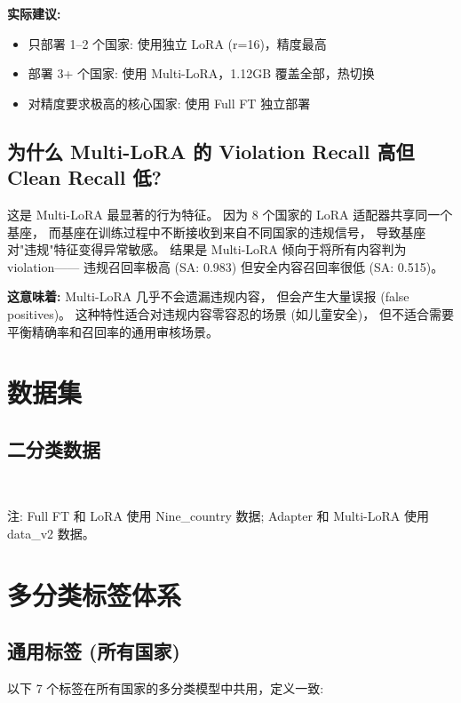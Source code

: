 \documentclass[11pt,a4paper]{article}
\begin{document}
\textbf{实际建议:}
\begin{itemize}
\item 只部署 1--2 个国家: 使用独立 LoRA (r=16)，精度最高
\item 部署 3+ 个国家: 使用 Multi-LoRA，1.12GB 覆盖全部，热切换
\item 对精度要求极高的核心国家: 使用 Full FT 独立部署
\end{itemize}

\subsection{为什么 Multi-LoRA 的 Violation Recall 高但 Clean Recall 低?}

这是 Multi-LoRA 最显著的行为特征。
因为 8 个国家的 LoRA 适配器共享同一个基座，
而基座在训练过程中不断接收到来自不同国家的违规信号，
导致基座对"违规"特征变得异常敏感。
结果是 Multi-LoRA 倾向于将所有内容判为 violation——
违规召回率极高 (SA: 0.983) 但安全内容召回率很低 (SA: 0.515)。

\textbf{这意味着:} Multi-LoRA 几乎不会遗漏违规内容，
但会产生大量误报 (false positives)。
这种特性适合对违规内容零容忍的场景 (如儿童安全)，
但不适合需要平衡精确率和召回率的通用审核场景。

\section{数据集}

\subsection{二分类数据}

\

注: Full FT 和 LoRA 使用 Nine\_country 数据; Adapter 和 Multi-LoRA 使用 data\_v2 数据。

\section{多分类标签体系}

\subsection{通用标签 (所有国家)}

以下 7 个标签在所有国家的多分类模型中共用，定义一致:
\end{document}
